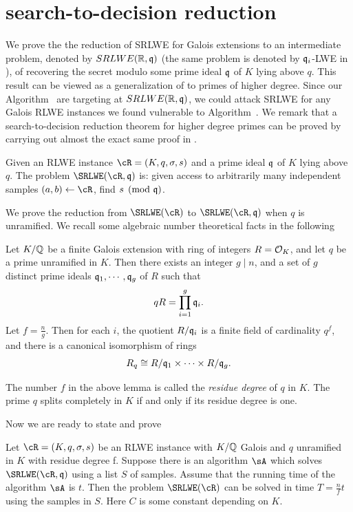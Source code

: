 \documentclass{amsart}
\begin{document}
\section{search-to-decision reduction}
\label{sec: s-to-d}

We prove the the reduction of SRLWE for Galois extensions to an intermediate problem, denoted by $SRLWE(\mathbb{R},\mathfrak{q})$ (the same problem is denoted by $\mathfrak{q}_i$-LWE in \cite{lyubashevsky2013ideal}), of recovering the secret modulo some prime ideal $\mathfrak{q}$ of $K $ lying above $q$. This result can be viewed as a generalization of \cite[Theorem 2]{eisentrager2014weak} to primes of higher degree. Since our Algorithm~ are targeting at $SRLWE(\mathbb{R},\mathfrak{q})$, we could attack SRLWE for any Galois RLWE instances we found vulnerable to Algorithm~. We remark that a search-to-decision reduction theorem for higher degree primes can be proved by carrying out almost the exact same proof in \cite{eisentrager2014weak}.

\begin{Definition} \label{def: srlwe mod q}
Given an RLWE instance $\cR = (K,q,\sigma, s)$ and a prime ideal $\mathfrak{q}$ of $K$ lying above $q$. The problem $\SRLWE(\cR, \fq)$ is: given access to arbitrarily many independent samples $(a,b) \gets \cR$, find $s \pmod {\mathfrak{q}}$.
\end{Definition}

We prove the reduction from $\SRLWE(\cR)$ to $\SRLWE(\cR,\fq)$ when
$q$ is unramified. We recall some algebraic number theoretical facts in the following
\begin{Lemma}
\label{lem: prime factorization}
Let $K/\mathbb{Q}$ be a finite Galois extension with ring of integers $R = \mathcal{O}_K$,  and let $q$ be a prime unramified in $K$. Then there exists an integer $g \mid n$, and a set of $g$ distinct prime ideals $\mathfrak{q}_1, \cdots ,\mathfrak{q}_g$ of
$R$ such that
\[
    qR = \prod_{i=1}^g \mathfrak{q}_i.
\]
Let $f = \frac{n}{g}$. Then for each $i$, the quotient $R/\mathfrak{q}_{i}$ is a finite field of cardinality $q^f$, and there is a canonical isomorphism of rings
\[
    R_q \cong R/\mathfrak{q}_{1} \times \cdots \times R/\mathfrak{q}_{g}.
\]
\end{Lemma}
The number $f$ in the above lemma is called the {\it residue degree} of $q$ in $K$. The prime $q$ splits completely in $K$ if and only if its residue degree is one.

Now we are ready to state and prove
\begin{theorem}
Let $\cR = (K,q,\sigma, s)$ be an RLWE instance with $K/\mathbb{Q}$ Galois and $q$ unramified in $K$ with residue degree f. Suppose there is an algorithm $\sA$ which solves $\SRLWE(\cR,\fq)$ using a list $S$ of samples. Assume that the running time of the algorithm $\sA$ is $t$. Then the problem $\SRLWE(\cR)$ can be solved in time $T = \frac{n}{f}t$ using the samples in $S$. Here $C$ is some constant depending on $K$.
\end{theorem}
\end{document}
